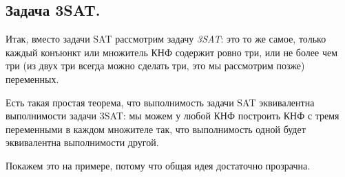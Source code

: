 \documentclass[russian]{lecture-notes}
\theoremstyle{definition}
\begin{document}
	\subsection*{Задача 3SAT.}	
		Итак, вместо задачи SAT рассмотрим задачу {\em 3SAT}: это то же самое, только каждый конъюнкт или множитель КНФ содержит ровно три, или не более чем три (из двух три всегда можно сделать три, это мы рассмотрим позже) переменных.
		
		Есть такая простая теорема, что выполнимость задачи SAT эквивалентна выполнимости задачи 3SAT: мы можем у любой КНФ построить КНФ с тремя переменными в каждом множителе так, что выполнимость одной будет эквивалентна выполнимости другой.
		
		Покажем это на примере, потому что общая идея достаточно прозрачна.
		
\end{document}

